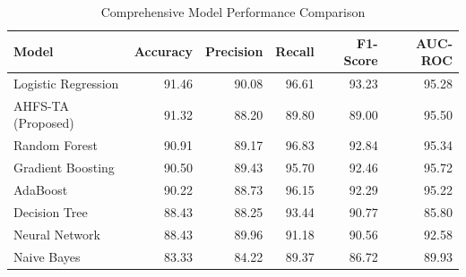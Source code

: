 \begin{table}
\caption{Comprehensive Model Performance Comparison}
\label{tab:model_comparison}
\begin{tabular}{lrrrrr}
\toprule
Model & Accuracy & Precision & Recall & F1-Score & AUC-ROC \\
\midrule
Logistic Regression & 91.46 & 90.08 & 96.61 & 93.23 & 95.28 \\
AHFS-TA (Proposed) & 91.32 & 88.20 & 89.80 & 89.00 & 95.50 \\
Random Forest & 90.91 & 89.17 & 96.83 & 92.84 & 95.34 \\
Gradient Boosting & 90.50 & 89.43 & 95.70 & 92.46 & 95.72 \\
AdaBoost & 90.22 & 88.73 & 96.15 & 92.29 & 95.22 \\
Decision Tree & 88.43 & 88.25 & 93.44 & 90.77 & 85.80 \\
Neural Network & 88.43 & 89.96 & 91.18 & 90.56 & 92.58 \\
Naive Bayes & 83.33 & 84.22 & 89.37 & 86.72 & 89.93 \\
\bottomrule
\end{tabular}
\end{table}
